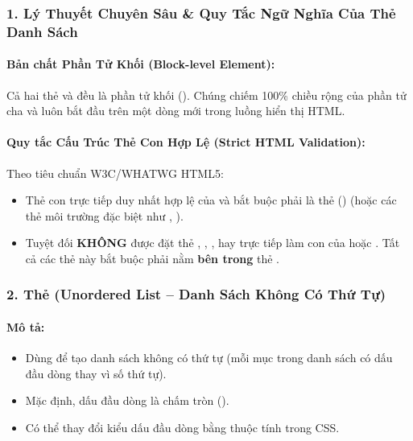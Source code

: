 \subsubsection{1. Lý Thuyết Chuyên Sâu \& Quy Tắc Ngữ Nghĩa Của Thẻ Danh Sách}

\paragraph{Bản chất Phần Tử Khối (Block-level Element):}
Cả hai thẻ  và  đều là phần tử khối (). Chúng chiếm 100\% chiều rộng của phần tử cha và luôn bắt đầu trên một dòng mới trong luồng hiển thị HTML.

\paragraph{Quy tắc Cấu Trúc Thẻ Con Hợp Lệ (Strict HTML Validation):}
\begin{warnBox}
Theo tiêu chuẩn W3C/WHATWG HTML5:
\begin{itemize}[leftmargin=1.5em, itemsep=3pt, parsep=0pt]
    \item Thẻ con trực tiếp duy nhất hợp lệ của  và  bắt buộc phải là thẻ  () (hoặc các thẻ môi trường đặc biệt như , ).
    \item Tuyệt đối \textbf{KHÔNG} được đặt thẻ , , , hay  trực tiếp làm con của  hoặc . Tất cả các thẻ này bắt buộc phải nằm \textbf{bên trong} thẻ .
\end{itemize}
\end{warnBox}

\subsubsection{2. Thẻ  (Unordered List -- Danh Sách Không Có Thứ Tự)}

\paragraph{Mô tả:}
\begin{itemize}[leftmargin=1.8em, itemsep=3pt, parsep=0pt]
    \item Dùng để tạo danh sách không có thứ tự (mỗi mục trong danh sách có dấu đầu dòng thay vì số thứ tự).
    \item Mặc định, dấu đầu dòng là chấm tròn ().
    \item Có thể thay đổi kiểu dấu đầu dòng bằng thuộc tính  trong CSS.
\end{itemize}

